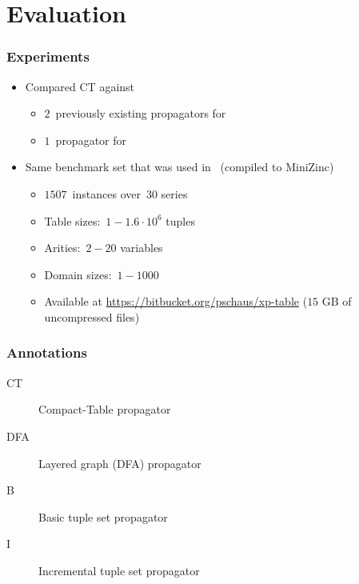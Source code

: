 \documentclass{beamer}
\newcommand{\Table}{\Constraint{Table}}
\newcommand{\CTpaper}[0]{DBLP:conf/cp/DemeulenaereHLP16}
\begin{document}
\section{Evaluation}

\begin{frame}
  \frametitle{Experiments}
  
  \begin{itemize}
    \item   Compared CT against
      \begin{itemize}
      \item $2$~previously existing propagators for \Table
      \item $1$~propagator for 
      \end{itemize} 
    \item Same benchmark set that was used in~\cite{\CTpaper}
      (compiled to MiniZinc)
      \begin{itemize}
        \item $1507$~instances over~$30$ series 
        \item Table sizes:~$1-1.6 \cdot 10^6$ tuples
        \item Arities:~$2-20$ variables
        \item Domain sizes:~$1-1000$
        \item Available at \url{https://bitbucket.org/pschaus/xp-table}
          ($15$ GB of uncompressed files)
      \end{itemize}
      
  \end{itemize}
\end{frame}

\begin{frame}
  \frametitle{Annotations}
    \begin{description}
    \item[CT] Compact-Table propagator
    \item[DFA] Layered graph (DFA) propagator%
    \item[B] Basic tuple set propagator%
    \item[I] Incremental tuple set propagator
  \end{description}
\end{frame}
\end{document}
